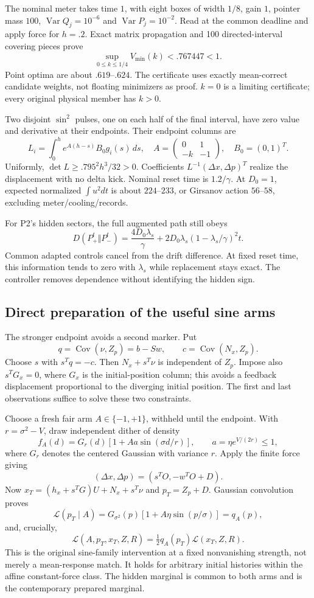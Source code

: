 \documentclass[11pt,a4paper]{article}
\newcommand{\Var}{\operatorname{Var}}\newcommand{\Cov}{\operatorname{Cov}}
\begin{document}
The nominal meter takes time $1$, with eight boxes of width $1/8$, gain $1$, pointer mass $100$, $\Var Q_j=10^{-6}$ and $\Var P_j=10^{-2}$. Read at the common deadline and apply force for $h=.2$. Exact matrix propagation and 100 directed-interval covering pieces prove
\[
 \sup_{0\le k\le1/4}V_{\min}(k)<.767447<1.
\]
Point optima are about $.619$--$.624$. The certificate uses exactly mean-correct candidate weights, not floating minimizers as proof. $k=0$ is a limiting certificate; every original physical member has $k>0$.

Two disjoint $\sin^2$ pulses, one on each half of the final interval, have zero value and derivative at their endpoints. Their endpoint columns are
\[
 L_i=\int_0^h e^{A(h-s)}B_0g_i(s)\,ds,\quad
 A=\begin{pmatrix}0&1\\-k&-1\end{pmatrix},\quad B_0=(0,1)^T.
\]
Uniformly, $\det L\ge .795^2h^3/32>0$. Coefficients $L^{-1}(\Delta x,\Delta p)^T$ realize the displacement with no delta kick. Nominal reset time is $1.2/\gamma$. At $D_0=1$, expected normalized $\int u^2dt$ is about $224$--$233$, or Girsanov action $56$--$58$, excluding meter/cooling/records.

For P2's hidden sectors, the full augmented path still obeys
\[
 D(P_+^t\Vert P_-^t)=
 \frac{4D_0\lambda_s}{\gamma}
 +2D_0\lambda_s(1-\lambda_s/\gamma)^2t.
\]
Common adapted controls cancel from the drift difference. At fixed reset time, this information tends to zero with $\lambda_s$ while replacement stays exact. The controller removes dependence without identifying the hidden sign.
\subsection{Direct preparation of the useful sine arms}
The stronger endpoint avoids a second marker. Put
\[
 q=\Cov(\nu,Z_p)=b-Sw,\qquad c=\Cov(N_x,Z_p).
\]
Choose $s$ with $s^Tq=-c$. Then $N_x+s^T\nu$ is independent of $Z_p$. Impose also $s^TG_x=0$, where $G_x$ is the initial-position column; this avoids a feedback displacement proportional to the diverging initial position. The first and last observations suffice to solve these two constraints.

Choose a fresh fair arm $A\in\{-1,+1\}$, withheld until the endpoint. With $r=\sigma^2-V$, draw independent dither of density
\[
 f_A(d)=G_r(d)\left[1+A a\sin(\sigma d/r)\right],
 \qquad a=\eta e^{V/(2r)}\le1,
\]
where $G_r$ denotes the centered Gaussian with variance $r$. Apply the finite force giving
\[
 (\Delta x,\Delta p)=(s^TO,-w^TO+D).
\]
Now $x_T=(h_x+s^TG)U+N_x+s^T\nu$ and $p_T=Z_p+D$. Gaussian convolution proves
\[
 \mathcal L(p_T\mid A)=
 G_{\sigma^2}(p)[1+A\eta\sin(p/\sigma)]=q_A(p),
\]
and, crucially,
\[
 \boxed{\mathcal L(A,p_T,x_T,Z,R)
       =\tfrac12 q_A(p_T)\mathcal L(x_T,Z,R).}
\]
This is the original sine-family intervention at a fixed nonvanishing strength, not merely a mean-response match. It holds for arbitrary initial histories within the affine constant-force class. The hidden marginal is common to both arms and is the contemporary prepared marginal.
\end{document}
